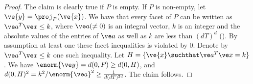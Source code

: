 \begin{proof}
The claim is clearly true if $P$ is empty.
If $P$ is non-empty, let $\ve{y} = \proj_P(\ve{x})$.
We have that every facet of $P$ can be written as $\ve a^T \ve x \leq k$, where $\ve a (\neq 0)$ is an integral vector, $k$ is an integer and the absolute values of the entries of $\ve a$ as well as $k$ are less than $(dT)^d$ (\cite[Theorem 3.6]{MR625550}).
By assumption at least one these facet inequalities is violated by 0. 
Denote by $\ve a^T \ve x \leq k$ one such inequality.
Let $H = \{\ve{x} \suchthat \ve a^T \ve x = k \}$. 
We have $\enorm{\ve y} = d(0,P) \geq d(0,H)$, and $d(0,H)^2 = k^2/\enorm{\ve a}^2 \geq \frac{1}{d (dT)^{2d}}$.
The claim follows.
\end{proof} 

%
\fi 
